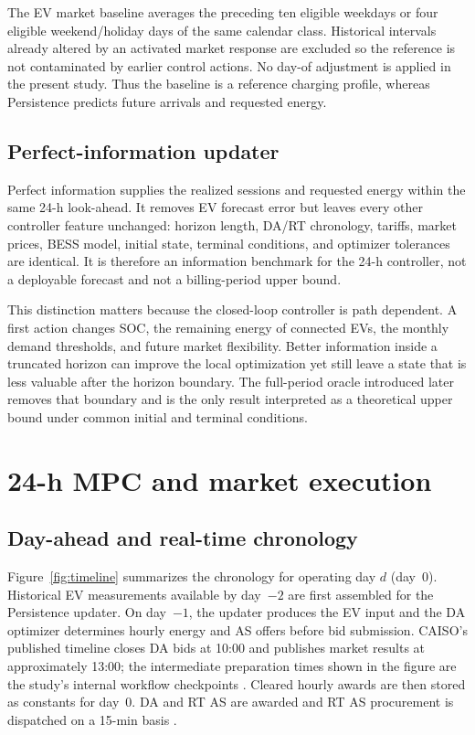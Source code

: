 \documentclass[final,5p,times]{elsarticle}
\begin{document}
The EV market baseline averages the preceding ten eligible weekdays or four eligible weekend/holiday days of the same calendar class. Historical intervals already altered by an activated market response are excluded so the reference is not contaminated by earlier control actions. No day-of adjustment is applied in the present study. Thus the baseline is a reference charging profile, whereas Persistence predicts future arrivals and requested energy.

\subsection{Perfect-information updater}
Perfect information supplies the realized sessions and requested energy within the same 24-h look-ahead. It removes EV forecast error but leaves every other controller feature unchanged: horizon length, DA/RT chronology, tariffs, market prices, BESS model, initial state, terminal conditions, and optimizer tolerances are identical. It is therefore an information benchmark for the 24-h controller, not a deployable forecast and not a billing-period upper bound.

This distinction matters because the closed-loop controller is path dependent. A first action changes SOC, the remaining energy of connected EVs, the monthly demand thresholds, and future market flexibility. Better information inside a truncated horizon can improve the local optimization yet still leave a state that is less valuable after the horizon boundary. The full-period oracle introduced later removes that boundary and is the only result interpreted as a theoretical upper bound under common initial and terminal conditions.

\section{24-h MPC and market execution}
\label{sec:mpc}

\subsection{Day-ahead and real-time chronology}
Figure~\ref{fig:timeline} summarizes the chronology for operating day $d$ (day~0). Historical EV measurements available by day~$-2$ are first assembled for the Persistence updater. On day~$-1$, the updater produces the EV input and the DA optimizer determines hourly energy and AS offers before bid submission. CAISO's published timeline closes DA bids at 10:00 and publishes market results at approximately 13:00; the intermediate preparation times shown in the figure are the study's internal workflow checkpoints \cite{caisoTimeline2026}. Cleared hourly awards are then stored as constants for day~0. DA and RT AS are awarded and RT AS procurement is dispatched on a 15-min basis \cite{caisoMarketOperations2026,caisoMarketInstruments2026}.
\end{document}
